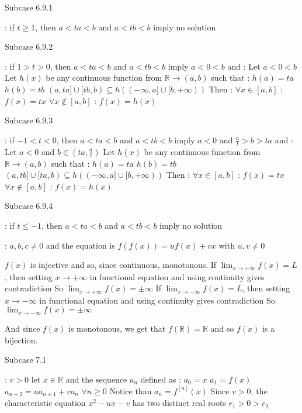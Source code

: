 \begin{solution}
\begin{bolded}Subcase 6.9.1\end{bolded} : if $t\ge 1$, then $a< ta<b$ and $a< tb< b$ imply no solution

\begin{bolded}Subcase 6.9.2\end{bolded} : if $1>t>0$, then $a< ta<b$ and $a< tb< b$ imply $a< 0< b$ and :
Let $a< 0< b$
Let $h(x)$ be any continuous function from $\mathbb R\to(a,b)$ such that :
$h(a)=ta$
$h(b)=tb$
$(a,ta]\cup[tb,b)\subseteq h((-\infty,a]\cup[b,+\infty))$
Then :
$\forall x\in[a,b]$ : $f(x)=tx$
$\forall x\notin[a,b]$ : $f(x)=h(x)$

\begin{bolded}Subcase 6.9.3\end{bolded} : if $-1< t<0$, then $a< ta<b$ and $a< tb< b$ imply $a< 0$ and $\frac at> b> ta$ and :
Let $a<0$ and $b\in(ta,\frac at)$
Let $h(x)$ be any continuous function from $\mathbb R\to(a,b)$ such that :
$h(a)=ta$
$h(b)=tb$
$(a,tb]\cup[ta,b)\subseteq h((-\infty,a]\cup[b,+\infty))$
Then :
$\forall x\in[a,b]$ : $f(x)=tx$
$\forall x\notin[a,b]$ : $f(x)=h(x)$

\begin{bolded}Subcase 6.9.4\end{bolded} : if $t\le -1$, then $a< ta<b$ and $a< tb< b$ imply no solution


 : $a,b,c\ne 0$ and the equation is $f(f(x))=uf(x)+vx$ with $u,v\ne 0$

$f(x)$ is injective and so, since continuous, monotonous.
If $\lim_{x\to+\infty}f(x)=L$, then setting $x\to+\infty$ in functional equation and using continuity gives contradiction
So $\lim_{x\to+\infty}f(x)=\pm\infty$
If $\lim_{x\to-\infty}f(x)=L$, then setting $x\to-\infty$ in functional equation and using continuity gives contradiction
So $\lim_{x\to-\infty}f(x)=\pm\infty$

And since $f(x)$ is monotonous, we get that $f(\mathbb R)=\mathbb R$ and so $f(x)$ is a bijection.

\begin{bolded}Subcase 7.1\end{bolded} : $v>0$
let $x\in\mathbb R$ and the sequence $a_n$ defined as :
$a_0=x$
$a_1=f(x)$
$a_{n+2}=ua_{n+1}+va_n$ $\forall n\ge 0$
Notice than $a_n=f^{[n]}(x)$
Since $v>0$, the characteristic equation $x^2-ux-v$ has two distinct real roots $r_1>0>r_2$


\end{solution}
